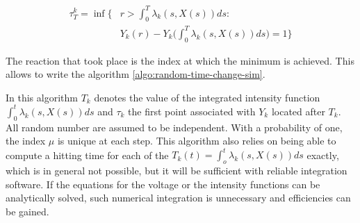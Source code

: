 		\begin{align*}
			\tau_T^k = \inf\biggl\{&r>\int_0^T\lambda_k(s, X(s))ds:\\
														 &Y_k(r)-Y_k\biggl(\int_0^T\lambda_k(s, X(s))ds\biggr)=1\biggr\}
		\end{align*}

		The reaction that took place is the index at which the minimum is achieved.
		This allows to write the algorithm \ref{algo:random-time-change-sim}.

		

		In this algorithm $T_k$ denotes the value of the integrated intensity function $\int_0^t\lambda_k(s, X(s))ds$ and $\tau_k$ the first point associated with $Y_k$ located after $T_k$.
		All random number are assumed to be independent.
		With a probability of one, the index $\mu$ is unique at each step.
		This algorithm also relies on being able to compute a hitting time for each of the $T_k(t) = \int_o^t\lambda_k(s, X(s))ds$ exactly, which is in general not possible, but it will be sufficient with reliable integration software.
		If the equations for the voltage or the intensity functions can be analytically solved, such numerical integration is unnecessary and efficiencies can be gained.
